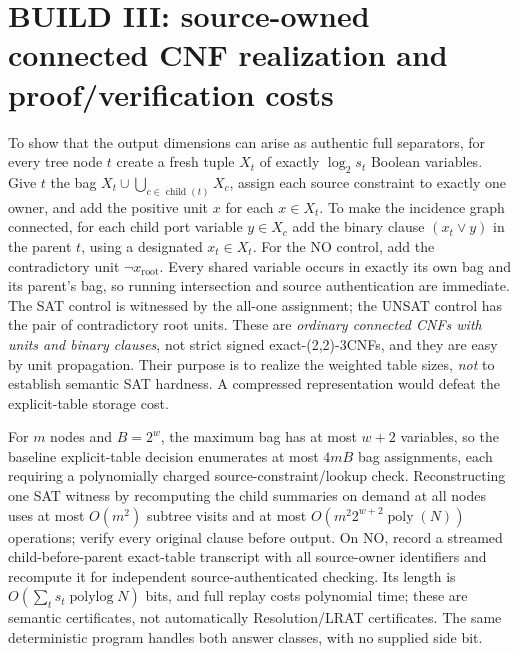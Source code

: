 \documentclass[11pt]{article}
\begin{document}
\section{BUILD III: source-owned connected CNF realization and proof/verification costs}
To show that the output dimensions can arise as authentic full separators, for every tree node $t$ create a fresh tuple $X_t$ of exactly $\log_2 s_t$ Boolean variables. Give $t$ the bag $X_t\cup\bigcup_{c\in\operatorname{child}(t)}X_c$, assign each source constraint to exactly one owner, and add the positive unit $x$ for each $x\in X_t$. To make the incidence graph connected, for each child port variable $y\in X_c$ add the binary clause $(x_t\lor y)$ in the parent $t$, using a designated $x_t\in X_t$. For the NO control, add the contradictory unit $\neg x_{\mathrm{root}}$. Every shared variable occurs in exactly its own bag and its parent's bag, so running intersection and source authentication are immediate. The SAT control is witnessed by the all-one assignment; the UNSAT control has the pair of contradictory root units. These are \emph{ordinary connected CNFs with units and binary clauses}, not strict signed exact-(2,2)-3CNFs, and they are easy by unit propagation. Their purpose is to realize the weighted table sizes, \emph{not} to establish semantic SAT hardness. A compressed representation would defeat the explicit-table storage cost.

For $m$ nodes and $B=2^w$, the maximum bag has at most $w+2$ variables, so the baseline explicit-table decision enumerates at most $4mB$ bag assignments, each requiring a polynomially charged source-constraint/lookup check. Reconstructing one SAT witness by recomputing the child summaries on demand at all nodes uses at most $O(m^2)$ subtree visits and at most $O(m^2 2^{w+2}\operatorname{poly}(N))$ operations; verify every original clause before output. On NO, record a streamed child-before-parent exact-table transcript with all source-owner identifiers and recompute it for independent source-authenticated checking. Its length is $O(\sum_t s_t\operatorname{polylog}N)$ bits, and full replay costs polynomial time; these are semantic certificates, not automatically Resolution/LRAT certificates. The same deterministic program handles both answer classes, with no supplied side bit.
\end{document}
